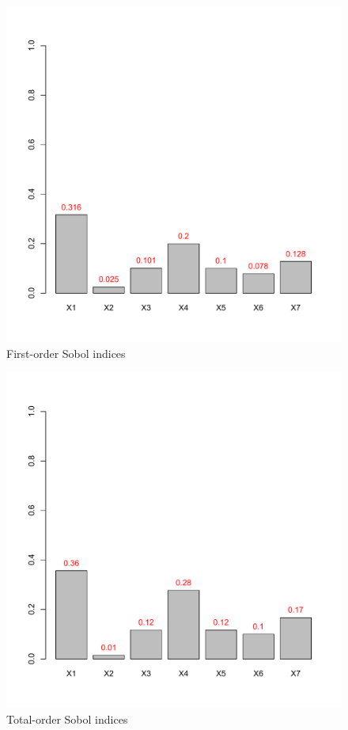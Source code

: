 \begin{figure}
    \centering
    \includegraphics[scale=0.53]{Chapter2/Pictures/first_sobol.pdf}
    \caption{First-order Sobol indices}
\end{figure}

\begin{figure}
    \centering
    \includegraphics[scale=0.53]{Chapter2/Pictures/total_sobol.pdf}
    \caption{Total-order Sobol indices}
\end{figure}

